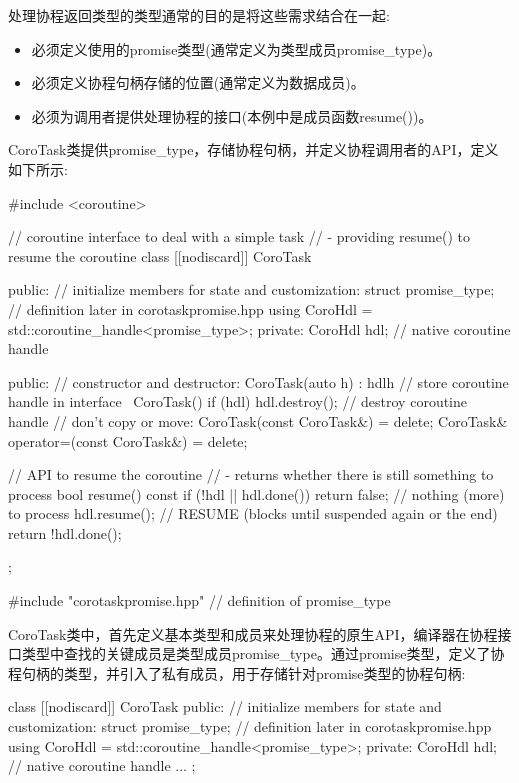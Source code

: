 处理协程返回类型的类型通常的目的是将这些需求结合在一起:

\begin{itemize}
\item
必须定义使用的promise类型(通常定义为类型成员promise\_type)。

\item
必须定义协程句柄存储的位置(通常定义为数据成员)。

\item
必须为调用者提供处理协程的接口(本例中是成员函数resume())。
\end{itemize}


CoroTask类提供promise\_type，存储协程句柄，并定义协程调用者的API，定义如下所示:


\begin{cpp}
#include <coroutine>

// coroutine interface to deal with a simple task
// - providing resume() to resume the coroutine
class [[nodiscard]] CoroTask {
public:
	// initialize members for state and customization:
	struct promise_type; // definition later in corotaskpromise.hpp
	using CoroHdl = std::coroutine_handle<promise_type>;
	private:
	CoroHdl hdl; // native coroutine handle

public:
	// constructor and destructor:
	CoroTask(auto h)
	: hdl{h} { // store coroutine handle in interface
	}
	~CoroTask() {
		if (hdl) {
			hdl.destroy(); // destroy coroutine handle
		}
	}
	// don’t copy or move:
	CoroTask(const CoroTask&) = delete;
	CoroTask& operator=(const CoroTask&) = delete;

	// API to resume the coroutine
	// - returns whether there is still something to process
	bool resume() const {
		if (!hdl || hdl.done()) {
			return false; // nothing (more) to process
		}
		hdl.resume(); // RESUME (blocks until suspended again or the end)
		return !hdl.done();
	}
};

#include "corotaskpromise.hpp" // definition of promise_type
\end{cpp}

CoroTask类中，首先定义基本类型和成员来处理协程的原生API，编译器在协程接口类型中查找的关键成员是类型成员promise\_type。通过promise类型，定义了协程句柄的类型，并引入了私有成员，用于存储针对promise类型的协程句柄:

\begin{cpp}
class [[nodiscard]] CoroTask {
public:
	// initialize members for state and customization:
	struct promise_type; // definition later in corotaskpromise.hpp
	using CoroHdl = std::coroutine_handle<promise_type>;
private:
	CoroHdl hdl; // native coroutine handle
	...
};
\end{cpp}


